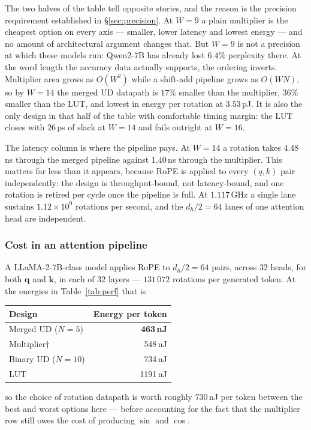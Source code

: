 The two halves of the table tell opposite stories, and the reason is the
precision requirement established in \S\ref{sec:precision}. At $W=9$ a plain
multiplier is the cheapest option on every axis --- smaller, lower latency and
lowest energy --- and no amount of architectural argument changes that. But
$W=9$ is not a precision at which these models run: Qwen2-7B has already lost
$6.4\%$ perplexity there. At the word length the accuracy data actually
supports, the ordering inverts. Multiplier area grows as $O(W^2)$ while a
shift-add pipeline grows as $O(WN)$, so by $W=14$ the merged UD datapath is
$17\%$ smaller than the multiplier, $36\%$ smaller than the LUT, and lowest in
energy per rotation at $3.53$\,pJ. It is also the only design in that half of
the table with comfortable timing margin: the LUT closes with $26$\,ps of
slack at $W=14$ and fails outright at $W=16$.

The latency column is where the pipeline pays. At $W=14$ a rotation takes
$4.48$\,ns through the merged pipeline against $1.40$\,ns through the
multiplier. This matters far less than it appears, because RoPE is applied to
every $(q,k)$ pair independently: the design is throughput-bound, not
latency-bound, and one rotation is retired per cycle once the pipeline is
full. At $1.117$\,GHz a single lane sustains $1.12\times10^{9}$ rotations per
second, and the $d_h/2 = 64$ lanes of one attention head are independent.

\subsubsection{Cost in an attention pipeline}
A LLaMA-2-7B-class model applies RoPE to $d_h/2 = 64$ pairs, across $32$ heads,
for both $\mathbf{q}$ and $\mathbf{k}$, in each of $32$ layers --- $131\,072$
rotations per generated token. At the energies in Table~\ref{tab:perf} that is

\begin{center}
\begin{tabular}{lr}
\toprule
Design & Energy per token \\
\midrule
Merged UD ($N{=}5$) & \textbf{463\,nJ} \\
Multiplier$\dagger$ & 548\,nJ \\
Binary UD ($N{=}10$)& 734\,nJ \\
LUT                 & 1191\,nJ \\
\bottomrule
\end{tabular}
\end{center}

so the choice of rotation datapath is worth roughly $730$\,nJ per token
between the best and worst options here --- before accounting for the fact
that the multiplier row still owes the cost of producing $\sin$ and $\cos$.
